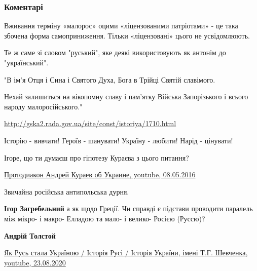  
 
 
 
 
\subsubsection{Коментарі}
\label{sec:26_09_2021.fb.zagrebelnyj_igor.1.malorossia.cmt}

\begin{itemize} %
Вживання терміну «малорос» оцими «ліцензованими патріотами» - це така збочена форма самоприниження. Тільки «ліцензовані» цього не усвідомлюють.

Те ж саме зі словом "руський", яке деякі використовують як антонім до "український".


"В ім'я Отця і Сина і Святого Духа, Бога в Трійці Святій славімого.

Нехай залишиться на вікопомну славу і пам'ятку Війська Запорізького і всього
народу малоросійського." 

\url{http://gska2.rada.gov.ua/site/const/istoriya/1710.html}

Історію - вивчати!
Героїв - шанувати!
Україну - любити!
Нарід - цінувати!

Ігоре, що ти думаєш про гіпотезу Кураєва з цього питання?

\href{https://www.youtube.com/watch?v=8ehI9YcuRoU}{%
Протодиакон Андрей Кураев об Украине, youtube, 08.05.2016%
}

\begin{itemize} %
Звичайна російська антипольська дурня.

\textbf{Ігор Загребельний} а як щодо Греції. Чи справді є підстави проводити
паралель між мікро- і макро- Елладою та мало- і велико- Росією (Руссю)?

\textbf{Андрій Толстой} 

\href{https://youtu.be/5Zna0WTzFtY}{%
Як Русь стала Україною / Історія Русі / Історія України, імені Т.Г. Шевченка, youtube, 23.08.2020%
}


\end{itemize}
\end{itemize}
